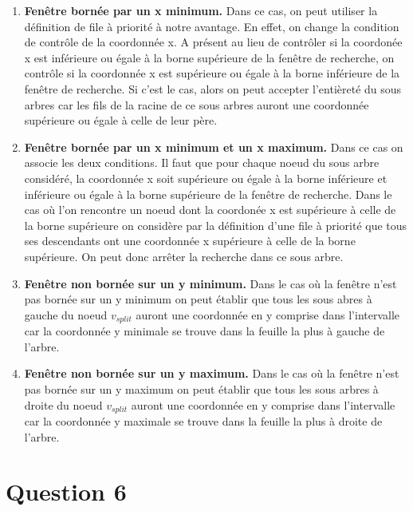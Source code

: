 \documentclass{article}
\begin{document}
    \begin{enumerate}
        \item \textbf{Fenêtre bornée par un x minimum.} Dans ce cas, on peut utiliser la définition de file à priorité à notre avantage. En effet, on change la condition de contrôle de la coordonnée x.
        A présent au lieu de contrôler si la coordonée x est inférieure ou égale à la borne supérieure de la fenêtre de recherche, on contrôle si la coordonnée x est supérieure ou égale à la borne inférieure de la fenêtre de recherche.
        Si c'est le cas, alors on peut accepter l'entièreté du sous arbres car les fils de la racine de ce sous arbres auront une coordonnée supérieure ou égale à celle de leur père.
        \item \textbf{Fenêtre bornée par un x minimum et un x maximum.} Dans ce cas on associe les deux conditions. Il faut que pour chaque noeud du sous arbre considéré, la coordonnée x soit supérieure ou égale à la borne inférieure et
        inférieure ou égale à la borne supérieure de la fenêtre de recherche. Dans le cas où l'on rencontre un noeud dont la coordonée x est supérieure à celle de la borne supérieure on considère par la définition
        d'une file à priorité que tous ses descendants ont une coordonnée x supérieure à celle de la borne supérieure. On peut donc arrêter la recherche dans ce sous arbre.
        \item \textbf{Fenêtre non bornée sur un y minimum.} Dans le cas où la fenêtre n'est pas bornée sur un y minimum on peut établir que tous les sous abres à gauche du noeud 
        $v_{split}$ auront une coordonnée en y comprise dans l'intervalle car la coordonnée y minimale se trouve dans la feuille la plus à gauche de l'arbre.
        \item \textbf{Fenêtre non bornée sur un y maximum.} Dans le cas où la fenêtre n'est pas bornée sur un y maximum on peut établir que tous les sous arbres à droite du noeud
        $v_{split}$ auront une coordonnée en y comprise dans l'intervalle car la coordonnée y maximale se trouve dans la feuille la plus à droite de l'arbre.
    \end{enumerate}
\newpage
\section{Question 6}
\end{document}
